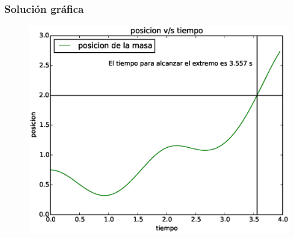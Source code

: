 \begin{frame}[fragile]
\frametitle{Solución gráfica}
\begin{figure}
	\centering
	\includegraphics[scale=0.5]{Examen3_P6_01.eps}
\end{figure}
\end{frame}
